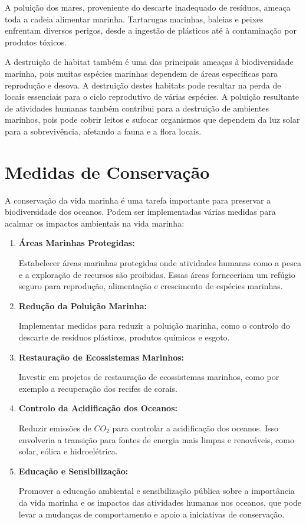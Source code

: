 \documentclass{report}
\begin{document}
A poluição dos mares, proveniente do descarte inadequado de resíduos, ameaça toda a cadeia alimentar marinha. Tartarugas marinhas, baleias e peixes enfrentam diversos perigos, desde a ingestão de plásticos até à contaminação por produtos tóxicos. 

A destruição de habitat também é uma das principais ameaças à biodiversidade marinha, pois muitas espécies marinhas dependem de áreas específicas para reprodução e desova. A destruição destes habitats pode resultar na perda de locais essenciais para o ciclo reprodutivo de várias espécies. A poluição resultante de atividades humanas também contribui para a destruição de ambientes marinhos, pois pode cobrir leitos e sufocar organismos que dependem da luz solar para a sobrevivência, afetando a fauna e a flora locais.





\section{Medidas de Conservação}
\label{medidas}
A conservação da vida marinha é uma tarefa importante para preservar a biodiversidade dos oceanos. Podem ser implementadas várias medidas para acalmar os impactos ambientais na vida marinha:
\begin{enumerate}
\item \textbf{Áreas Marinhas Protegidas:}

Estabelecer áreas marinhas protegidas onde atividades humanas como a pesca e a exploração de recursos são proibidas. Essas áreas forneceriam um refúgio seguro para reprodução, alimentação e crescimento de espécies marinhas.

\item \textbf{Redução da Poluição Marinha:}

Implementar medidas para reduzir a poluição marinha, como o controlo do descarte de resíduos plásticos, produtos químicos e esgoto.
 
\item \textbf{Restauração de Ecossistemas Marinhos:}

Investir em projetos de restauração de ecossistemas marinhos, como por exemplo a recuperação dos recifes de corais.

\item \textbf{Controlo da Acidificação dos Oceanos:}

Reduzir emissões de $CO_{2}$ para controlar a acidificação dos oceanos. Isso envolveria a transição para fontes de energia mais limpas e renováveis, como solar, eólica e hidroelétrica.

\item \textbf{Educação e Sensibilização:}

Promover a educação ambiental e sensibilização pública sobre a importância da vida marinha e os impactos das atividades humanas nos oceanos, que pode levar a mudanças de comportamento e apoio a iniciativas de conservação.


\end{enumerate}
\end{document}
